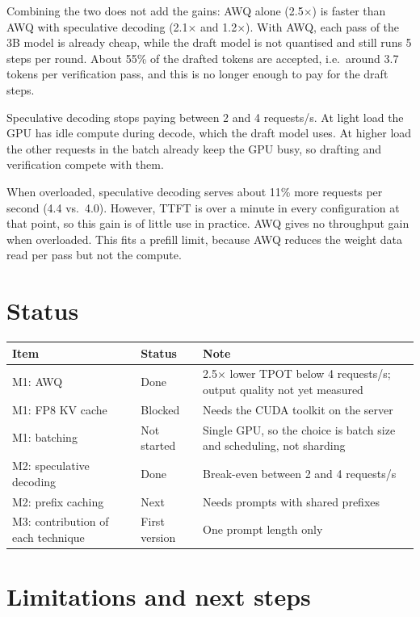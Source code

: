 \documentclass[11pt,a4paper]{article}
\begin{document}
Combining the two does not add the gains: AWQ alone (2.5$\times$) is faster than AWQ with speculative decoding (2.1$\times$ and 1.2$\times$). With AWQ, each pass of the 3B model is already cheap, while the draft model is not quantised and still runs 5 steps per round. About 55\% of the drafted tokens are accepted, i.e.\ around 3.7 tokens per verification pass, and this is no longer enough to pay for the draft steps.

Speculative decoding stops paying between 2 and 4 requests/s. At light load the GPU has idle compute during decode, which the draft model uses. At higher load the other requests in the batch already keep the GPU busy, so drafting and verification compete with them.

When overloaded, speculative decoding serves about 11\% more requests per second (4.4 vs.\ 4.0). However, TTFT is over a minute in every configuration at that point, so this gain is of little use in practice. AWQ gives no throughput gain when overloaded. This fits a prefill limit, because AWQ reduces the weight data read per pass but not the compute.

\section{Status}

\begin{tabularx}{\linewidth}{@{}P{3.6cm}P{2.4cm}X@{}}
\toprule
Item & Status & Note\\
\midrule
M1: AWQ & Done & 2.5$\times$ lower TPOT below 4 requests/s; output quality not yet measured\\
M1: FP8 KV cache & Blocked & Needs the CUDA toolkit on the server\\
M1: batching & Not started & Single GPU, so the choice is batch size and scheduling, not sharding\\
M2: speculative decoding & Done & Break-even between 2 and 4 requests/s\\
M2: prefix caching & Next & Needs prompts with shared prefixes\\
M3: contribution of each technique & First version & One prompt length only\\
\bottomrule
\end{tabularx}

\section{Limitations and next steps}
\end{document}
